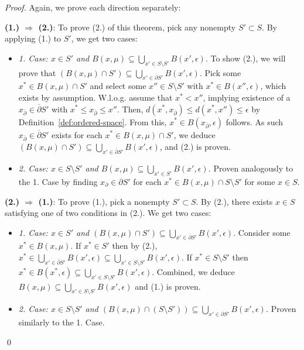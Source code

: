 \begin{proof}
    Again, we prove each direction separately:

    \textbf{(1.) $\Rightarrow$ (2.)}:
    To prove (2.) of this theorem, pick any nonempty $S' \subset S$. By applying (1.) to $S'$, we get two cases:
    \begin{itemize}    
        \item \textit{1. Case: $x \in S'$ and $B(x,\mu) \subseteq \bigcup_{x' \in S \setminus S'} B(x', \epsilon)$}. To show (2.), we will prove that $(B(x,\mu) \cap S') \subseteq \bigcup_{x' \in \overline{\partial}S'} B(x', \epsilon)$. Pick some $x^* \in B(x, \mu) \cap S'$ and select some $x'' \in S \setminus S'$ with $x^* \in B(x'', \epsilon)$, which exists by assumption. W.l.o.g. assume that $x^* < x''$, implying existence of a $x_{\overline{\partial}} \in \overline{\partial} S'$ with $x^* \leq x_{\overline{\partial}} \leq x''$. Then, $d(x^*, x_{\overline{\partial}}) \leq d(x^*, x'') \leq \epsilon$ by Definition~\ref{def:ordered-space}. From this, $x^* \in B(x_{\overline{\partial}}, \epsilon)$ follows. As such $x_{\overline{\partial}} \in \overline{\partial} S'$ exists for each $x^* \in B(x, \mu) \cap S'$, we deduce $(B(x,\mu) \cap S') \subseteq \bigcup_{x' \in \overline{\partial}S'} B(x', \epsilon)$, and (2.) is proven.
        \item \textit{2. Case: $x \in S \setminus S'$ and $B(x,\mu) \subseteq \bigcup_{x' \in S'} B(x', \epsilon)$.} Proven analogously to the 1. Case by finding $x_{\partial} \in \partial S'$ for each $x^* \in B(x,\mu) \cap S \setminus S'$ for some $x \in S$.
    \end{itemize}

    \textbf{(2.) $\Rightarrow$ (1.)}:
    To prove (1.), pick a nonempty $S' \subset S$. By (2.), there exists $x \in S$ satisfying one of two conditions in (2.). We get two cases:
    \begin{itemize}
        \item \textit{1. Case: $x \in S'$ and $(B(x, \mu) \cap S') \subseteq \bigcup_{x' \in \overline{\partial}S'}  B(x', \epsilon)$}. Consider some $x^* \in B(x, \mu)$. If $x^* \in S'$ then by (2.), $x^* \in \bigcup_{x' \in \overline{\partial}S'} B(x', \epsilon) \subseteq \bigcup_{x' \in S \setminus S'} B(x', \epsilon)$. If $x^* \in S \setminus S'$ then $x^* \in B(x^*, \epsilon) \subseteq \bigcup_{x' \in S \setminus S'} B(x', \epsilon)$. Combined, we deduce $B(x, \mu) \subseteq \bigcup_{x' \in S \setminus S'} B(x', \epsilon)$ and (1.) is proven.
        \item \textit{2. Case: $x \in S \setminus S'$ and $(B(x,\mu) \cap (S \setminus S')) \subseteq \bigcup_{x' \in \partial S'} B(x', \epsilon)$.} Proven similarly to the 1. Case.
    \end{itemize}
    \qed
\end{proof}


